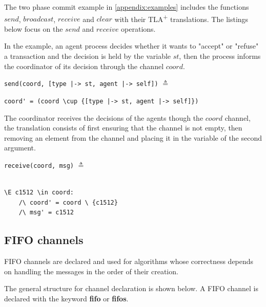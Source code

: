 \documentclass{thesul}
\newcommand{\tlaplus}{TLA\textsuperscript{+}\xspace}
\newcommand{\keyword}[1]{\textbf{#1}}
\begin{document}
The two phase commit example in \ref{appendix:examples} includes the functions $send$, $broadcast$, $receive$ and $clear$ with their \tlaplus translations. The listings below focus on the $send$ and $receive$ operations.

In the example, an agent process decides whether it wants to "accept" or "refuse" a transaction and the decision is held by the variable $st$, then the process informs the coordinator of its decision through the channel $coord$.

\begin{minipage}{.46\textwidth}

\lstinline!send(coord, [type |-> st, agent |-> self])! $\triangleq$
\end{minipage}
\begin{minipage}{.9\textwidth}
\lstinline!coord' = (coord \cup {[type |-> st, agent |-> self]})!
\end{minipage}\hfill\hfill

The coordinator receives the decisions of the agents though the $coord$ channel, the translation consists of first ensuring that the channel is not empty, then removing an element from the channel and placing it in the variable of the second argument. 

\begin{minipage}{.25\textwidth}

\lstinline!receive(coord, msg)! $\triangleq$\\\\
\end{minipage}
\begin{minipage}{.9\textwidth}
\begin{lstlisting}[frame = none, numbers = none]
\E c1512 \in coord:
	/\ coord' = coord \ {c1512}
	/\ msg' = c1512
\end{lstlisting}

\end{minipage}\hfill


\subsection{FIFO channels}

FIFO channels are declared and used for algorithms whose correctness depends on handling the messages in the order of their creation.

The general structure for channel declaration is shown below. A FIFO channel is declared with the keyword \keyword{fifo} or \keyword{fifos}. 
\end{document}
